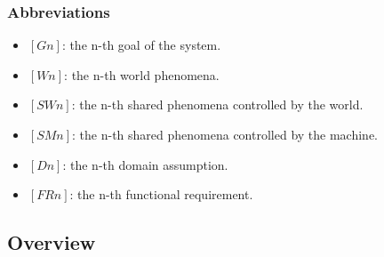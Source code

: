 \documentclass{article}
\begin{document}
\subsubsection{Abbreviations}
\begin{itemize}
    \item \textbf{$[Gn]$}: the n-th goal of the system.
    \item \textbf{$[Wn]$}: the n-th world phenomena.
    \item \textbf{$[SWn]$}: the n-th shared phenomena controlled by the world.
    \item \textbf{$[SMn]$}: the n-th shared phenomena controlled by the machine.
    \item \textbf{$[Dn]$}: the n-th domain assumption.
    \item \textbf{$[FRn]$}: the n-th functional requirement.
\end{itemize}

\subsection{Overview}
\end{document}
